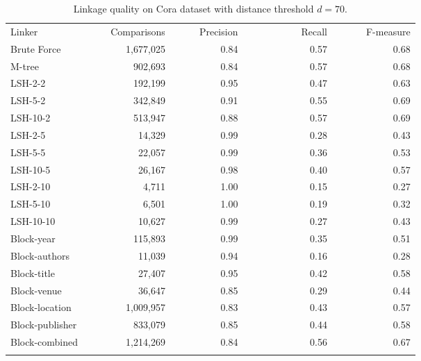 \documentclass{llncs}
\begin{document}

\begin{table}[t]
\caption{Linkage quality on Cora dataset with distance threshold $d= 70$.}
\label{comparison-of-results-cora}
\centering
\begin{footnotesize}
\begin{tabular}{lrrrr} \hline\noalign{\smallskip}
Linker~~~~~~~~~~ & ~~~Comparisons & ~~~~~Precision & ~~~~~~~~~~~Recall & ~~~~~~F-measure \\
\noalign{\smallskip} \hline \noalign{\smallskip}
Brute Force     & 1,677,025 & 0.84 & 0.57 & 0.68 \\
\noalign{\smallskip} \hline \noalign{\smallskip}
M-tree          &   902,693 & 0.84 & 0.57 & 0.68 \\
\noalign{\smallskip} \hline \noalign{\smallskip}
LSH-2-2         &   192,199 & 0.95 & 0.47 & 0.63 \\
LSH-5-2         &   342,849 & 0.91 & 0.55 & 0.69 \\
LSH-10-2        &   513,947 & 0.88 & 0.57 & 0.69 \\
LSH-2-5         &    14,329 & 0.99 & 0.28 & 0.43 \\
LSH-5-5         &    22,057 & 0.99 & 0.36 & 0.53 \\
LSH-10-5        &    26,167 & 0.98 & 0.40 & 0.57 \\
LSH-2-10        &     4,711 & 1.00 & 0.15 & 0.27 \\
LSH-5-10        &     6,501 & 1.00 & 0.19 & 0.32 \\
LSH-10-10       &    10,627 & 0.99 & 0.27 & 0.43 \\
\noalign{\smallskip} \hline \noalign{\smallskip}
Block-year      &   115,893 & 0.99 & 0.35 & 0.51 \\
Block-authors   &    11,039 & 0.94 & 0.16 & 0.28 \\
Block-title     &    27,407 & 0.95 & 0.42 & 0.58 \\
Block-venue     &    36,647 & 0.85 & 0.29 & 0.44 \\
Block-location  & 1,009,957 & 0.83 & 0.43 & 0.57 \\
Block-publisher &   833,079 & 0.85 & 0.44 & 0.58 \\
Block-combined  & 1,214,269 & 0.84 & 0.56 & 0.67 \\
\noalign{\smallskip} \hline
\end{tabular}
\end{footnotesize}
\end{table}
\end{document}
